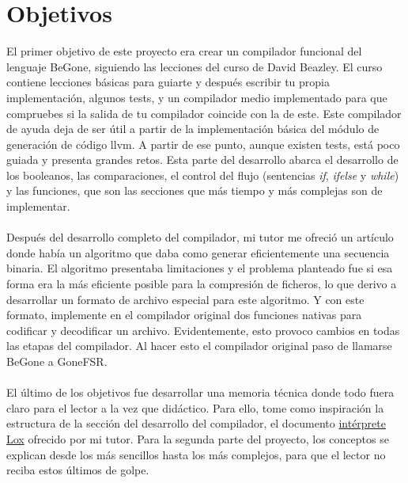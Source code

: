 \section{Objetivos}
El primer objetivo de este proyecto era crear un compilador funcional del lenguaje BeGone, siguiendo las lecciones del curso de David Beazley. El curso contiene lecciones básicas para guiarte y después escribir tu propia implementación, algunos tests, y un compilador medio implementado para que compruebes si la salida de tu compilador coincide con la de este. Este compilador de ayuda deja de ser útil a partir de la implementación básica del módulo de generación de código llvm. A partir de ese punto, aunque existen tests, está poco guiada y presenta grandes retos. Esta parte del desarrollo abarca el desarrollo de los booleanos, las comparaciones, el control del flujo (sentencias \textit{if}, \textit{ifelse} y \textit{while}) y las funciones, que son las secciones que más tiempo y más complejas son de implementar. \\\\
Después del desarrollo completo del compilador, mi tutor me ofreció un artículo \cite{limniotis2007nonlinear} donde había un algoritmo que daba como generar eficientemente  una secuencia binaria. El algoritmo presentaba limitaciones y el problema planteado fue si esa forma era la más eficiente posible para la compresión de ficheros, lo que derivo a desarrollar un formato de archivo especial para este algoritmo. Y con este formato, implemente en el compilador original dos funciones nativas para codificar y decodificar un archivo. Evidentemente, esto provoco cambios en todas las etapas del compilador. Al hacer esto el compilador original paso de llamarse BeGone a GoneFSR. \\\\
El último de los objetivos fue desarrollar una memoria técnica donde todo fuera claro para el lector a la vez que didáctico. Para ello, tome como inspiración la estructura de la sección del desarrollo del compilador, el documento \href{https://repositorio.unican.es/xmlui/handle/10902/30046}{intérprete Lox} ofrecido por mi tutor. Para la segunda parte del proyecto, los conceptos se explican desde los más sencillos hasta los más complejos, para que el lector no reciba estos últimos de golpe.

